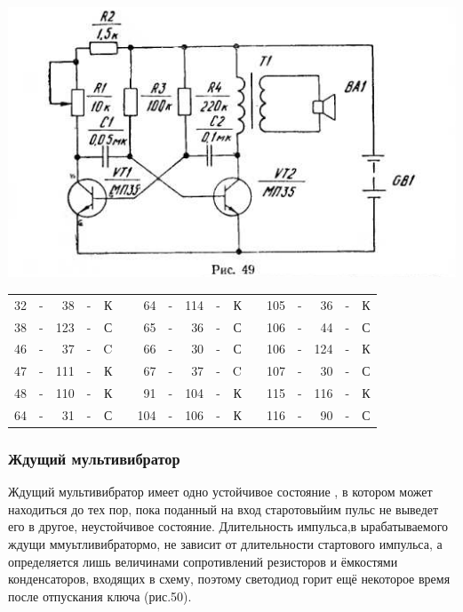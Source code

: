 \documentclass[12pt]{article}
\begin{document}
\hspace*{0.7cm}\includegraphics[scale=0.9, angle=0]{ekon3_049_1}

\hrulefill

\begin{tabular}{r c r c r p{2cm} r c r c r p{2cm} r c r c r}
32 & - &  38 & - & К &     &  64 & - & 114 & - & К &    & 105 & - &  36 & - & К\\
38 & - & 123 & - & С &     &  65 & - &  36 & - & С &    & 106 & - &  44 & - & С\\
46 & - &  37 & - & C &     &  66 & - &  30 & - & С &    & 106 & - & 124 & - & К\\
47 & - & 111 & - & К &     &  67 & - &  37 & - & C &    & 107 & - &  30 & - & С\\
48 & - & 110 & - & К &     &  91 & - & 104 & - & К &    & 115 & - & 116 & - & К\\
64 & - &  31 & - & С &     & 104 & - & 106 & - & К &    & 116 & - &  90 & - & С\\
\end{tabular}

\hrulefill

\newpage

\subsubsection{Ждущий мультивибратор}

Ждущий мультивибратор имеет одно устойчивое состояние , в котором может находиться до тех пор, пока поданный на вход старотовыйим пульс не выведет его в другое, неустойчивое состояние. Длительность импульса,в ырабатываемого ждущи ммуьтливибратормо, не зависит от длительности стартового импульса, а определяется лишь величинами сопротивлений резисторов и ёмкостями конденсаторов, входящих в схему, поэтому светодиод горит ещё некоторое время после отпускания ключа (рис.50).
\end{document}
